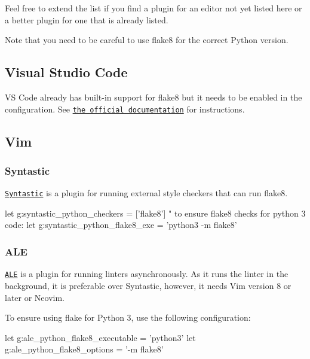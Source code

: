 Feel free to extend the list if you find a plugin for an editor not yet listed here or a better plugin for one that is already listed.

Note that you need to be careful to use flake8 for the correct Python version.

\subsection*{Visual Studio Code}

VS Code already has built-\/in support for flake8 but it needs to be enabled in the configuration. See \href{https://code.visualstudio.com/docs/python/linting}{\tt the official documentation} for instructions.

\subsection*{Vim}

\subsubsection*{Syntastic}

\href{https://github.com/vim-syntastic/syntastic}{\tt Syntastic} is a plugin for running external style checkers that can run flake8. \begin{DoxyVerb}let g:syntastic_python_checkers = ['flake8']
" to ensure flake8 checks for python 3 code:
let g:syntastic_python_flake8_exe = 'python3 -m flake8'
\end{DoxyVerb}


\subsubsection*{A\+LE}

\href{https://github.com/dense-analysis/ale}{\tt A\+LE} is a plugin for running linters asynchronously. As it runs the linter in the background, it is preferable over Syntastic, however, it needs Vim version 8 or later or Neovim.

To ensure using flake for Python 3, use the following configuration\+: \begin{DoxyVerb}let g:ale_python_flake8_executable = 'python3'
let g:ale_python_flake8_options = '-m flake8'\end{DoxyVerb}
 